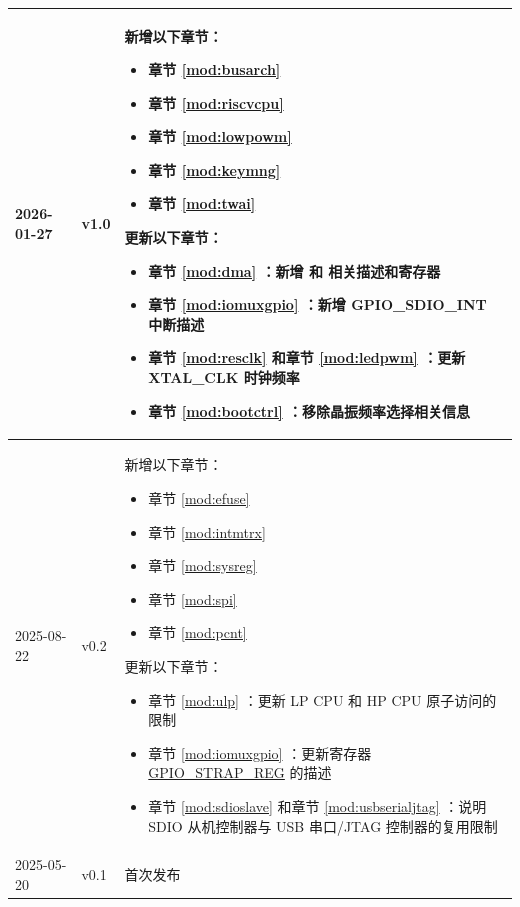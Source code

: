 \begin{longtable}[l]{ | m{2cm} | m{1.5cm} | m{12cm} | }
    \\\hline
    2026-01-27 & v1.0 & 新增以下章节：
    \begin{itemize}
        \item 章节 \ref{mod:busarch} \textit{\nameref{mod:busarch}}
        \item 章节 \ref{mod:riscvcpu} \textit{\nameref{mod:riscvcpu}}
        \item 章节 \ref{mod:lowpowm} \textit{\nameref{mod:lowpowm}}
        \item 章节 \ref{mod:keymng} \textit{\nameref{mod:keymng}}
        \item 章节 \ref{mod:twai} \textit{\nameref{mod:twai}}
    \end{itemize}
    更新以下章节：
    \begin{itemize}
        \item 章节 \ref{mod:dma} \textit{\nameref{mod:dma}}：新增 \nameref{sec:dma-bus-error-resp} 和 \nameref{sec:dma-auto-clk-gating} 相关描述和寄存器
        \item 章节 \ref{mod:iomuxgpio} \textit{\nameref{mod:iomuxgpio}}：新增 GPIO\_SDIO\_INT 中断描述
        \item 章节 \ref{mod:resclk} \textit{\nameref{mod:resclk}} 和章节 \ref{mod:ledpwm} \textit{\nameref{mod:ledpwm}}：更新 XTAL\_CLK 时钟频率
        \item 章节 \ref{mod:bootctrl} \textit{\nameref{mod:bootctrl}}：移除晶振频率选择相关信息
    \end{itemize}
    \\\hline
    2025-08-22 & v0.2 & 新增以下章节：
    \begin{itemize}
        \item 章节 \ref{mod:efuse} \textit{\nameref{mod:efuse}}
        \item 章节 \ref{mod:intmtrx} \textit{\nameref{mod:intmtrx}}
        \item 章节 \ref{mod:sysreg} \textit{\nameref{mod:sysreg}}
        \item 章节 \ref{mod:spi} \textit{\nameref{mod:spi}}
        \item 章节 \ref{mod:pcnt} \textit{\nameref{mod:pcnt}}
    \end{itemize}
    更新以下章节：
    \begin{itemize}
        \item 章节 \ref{mod:ulp} \textit{\nameref{mod:ulp}}：更新 LP CPU 和 HP CPU 原子访问的限制 %
        \item 章节 \ref{mod:iomuxgpio} \textit{\nameref{mod:iomuxgpio}}：更新寄存器 \hyperref[fielddesc:GPIOSTRAPPING]{GPIO\_STRAP\_REG} 的描述
        \item 章节 \ref{mod:sdioslave} \textit{\nameref{mod:sdioslave}} 和章节 \ref{mod:usbserialjtag} \textit{\nameref{mod:usbserialjtag}}：说明 SDIO 从机控制器与 USB 串口/JTAG 控制器的复用限制 %
    \end{itemize}
    \\\hline
    2025-05-20 & v0.1 & 首次发布\\\hline
\end{longtable}

